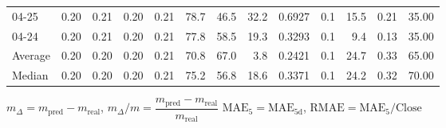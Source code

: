 \begin{threeparttable}
{\begin{tabular}{lrrrrrrrrrrrr}
  04-25 &          0.20 &          0.21 &          0.20 &        0.21 &                78.7 &                46.5 &       32.2 &       0.6927 &                 0.1 &             15.5 &            0.21 &                  35.00 \\
  04-24 &          0.20 &          0.21 &          0.20 &        0.21 &                77.8 &                58.5 &       19.3 &       0.3293 &                 0.1 &              9.4 &            0.13 &                  35.00 \\
Average &          0.20 &          0.20 &          0.20 &        0.21 &                70.8 &                67.0 &        3.8 &       0.2421 &                 0.1 &             24.7 &            0.33 &                  65.00 \\
 Median &          0.20 &          0.20 &          0.20 &        0.21 &                75.2 &                56.8 &       18.6 &       0.3371 &                 0.1 &             24.2 &            0.32 &                  70.00 \\
\bottomrule
\end{tabular}
}
\begin{tablenotes}\footnotesize
\item $m_\Delta=m_{\text{pred}}-m_{\text{real}}$,
$m_\Delta/m=\dfrac{m_{\text{pred}}-m_{\text{real}}}{m_{\text{real}}}$
$\mathrm{MAE}_5=\mathrm{MAE}_{5\text{d}}$,
$\mathrm{RMAE}=\mathrm{MAE}_5/\text{Close}$
\end{tablenotes}
\end{threeparttable}
\endgroup

